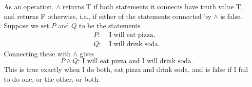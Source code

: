 \noindent As an operation, $\wedge$ returns T if both statements
it connects have truth value T, and returns F otherwise, i.e., if
either of the statements connected by $\wedge$ is false.
\bex Suppose we set $P$ and $Q$ to be the statements
\begin{align*}
P:&\ \text{I will eat  pizza,}\\
Q:&\ \text{I will drink  soda.}
\end{align*}
Connecting these with $\wedge$ gives
$$P\wedge Q:\ \text{I will eat pizza and I will drink soda.}$$
This is true exactly when I do both, eat pizza and drink soda,
and is false if I fail to do one, or the other, or both.
\label{PWedgeQDiscussion}
\eex
%

